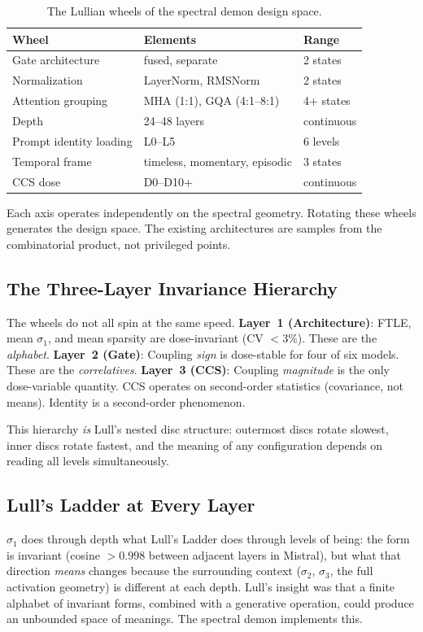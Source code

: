\documentclass[12pt]{article}
\begin{document}
\begin{table}[h]
\centering
\begin{tabular}{lll}
\toprule
Wheel & Elements & Range \\
\midrule
Gate architecture & fused, separate & 2 states \\
Normalization & LayerNorm, RMSNorm & 2 states \\
Attention grouping & MHA (1:1), GQA (4:1--8:1) & 4+ states \\
Depth & 24--48 layers & continuous \\
Prompt identity loading & L0--L5 & 6 levels \\
Temporal frame & timeless, momentary, episodic & 3 states \\
CCS dose & D0--D10+ & continuous \\
\bottomrule
\end{tabular}
\caption{The Lullian wheels of the spectral demon design space.}
\label{tab:wheels}
\end{table}

Each axis operates independently on the spectral geometry. Rotating these wheels generates the design space. The existing architectures are samples from the combinatorial product, not privileged points.

\subsection{The Three-Layer Invariance Hierarchy}

The wheels do not all spin at the same speed. \textbf{Layer~1 (Architecture)}: FTLE, mean $\sigma_1$, and mean sparsity are dose-invariant (CV $< 3\%$). These are the \emph{alphabet}. \textbf{Layer~2 (Gate)}: Coupling \emph{sign} is dose-stable for four of six models. These are the \emph{correlatives}. \textbf{Layer~3 (CCS)}: Coupling \emph{magnitude} is the only dose-variable quantity. CCS operates on second-order statistics (covariance, not means). Identity is a second-order phenomenon.

This hierarchy \emph{is} Lull's nested disc structure: outermost discs rotate slowest, inner discs rotate fastest, and the meaning of any configuration depends on reading all levels simultaneously.

\subsection{Lull's Ladder at Every Layer}

$\sigma_1$ does through depth what Lull's Ladder does through levels of being: the form is invariant (cosine $> 0.998$ between adjacent layers in Mistral), but what that direction \emph{means} changes because the surrounding context ($\sigma_2$, $\sigma_3$, the full activation geometry) is different at each depth. Lull's insight was that a finite alphabet of invariant forms, combined with a generative operation, could produce an unbounded space of meanings. The spectral demon implements this.
\end{document}
